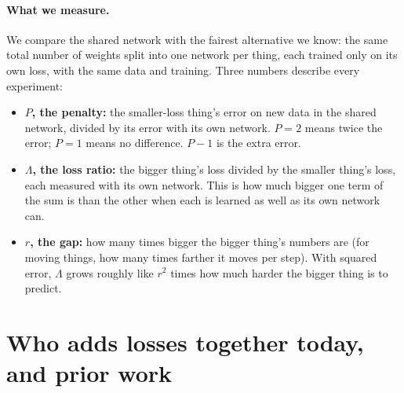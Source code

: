 \documentclass[11pt]{article}
\newcommand{\Lam}{\Lambda}
\newcommand{\para}[1]{\paragraph{#1}}
\begin{document}
\para{What we measure.} We compare the shared network with the fairest alternative we know: the same total number of weights split into one network per thing, each trained only on its own loss, with the same data and training. Three numbers describe every experiment:
\begin{itemize}
\item \textbf{$P$, the penalty:} the smaller-loss thing's error on new data in the shared network, divided by its error with its own network. $P=2$ means twice the error; $P=1$ means no difference. $P-1$ is the extra error.
\item \textbf{$\Lam$, the loss ratio:} the bigger thing's loss divided by the smaller thing's loss, each measured with its own network. This is how much bigger one term of the sum is than the other when each is learned as well as its own network can.
\item \textbf{$r$, the gap:} how many times bigger the bigger thing's numbers are (for moving things, how many times farther it moves per step). With squared error, $\Lam$ grows roughly like $r^2$ times how much harder the bigger thing is to predict.
\end{itemize}

\section{Who adds losses together today, and prior work}
\label{sec:related}
\end{document}
